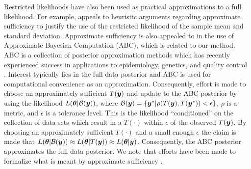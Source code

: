 \documentclass[12pt]{article}
\def\bth{\mbox{\boldmath $\theta$}}
\newcommand{\by}{\mbox{\boldmath $y$}}
\newcommand{\bz}{\mbox{\boldmath $z$}}
\newcommand{\red}[1]{{\color{red}#1}}
\begin{document}
Restricted likelihoods have also been used as practical approximations to a full likelihood. For example, \cite{pratt1965} appeals to heuristic arguments regarding approximate sufficiency to justify the use of the restricted likelihood of the sample mean and standard deviation. Approximate sufficiency is also appealed to in the use of Approximate Bayesian Computation (ABC), which is related to our method.  
ABC is a collection of posterior approximation methods which has recently experienced success in applications to epidemiology, genetics, and quality control \citep[see, for example,][]{tavare1997, pritchard1999,  marjoram2003, fearnhead2012}. Interest typically lies in the full data posterior and ABC is used for computational convenience as an approximation.  Consequently, effort is made to choose an approximately sufficient $T(\by)$ and update to the ABC posterior by using the likelihood $L(\bth| \mathcal{B}(\by))$, where $\mathcal{B}(\by)=\{\by^{*}|\rho(T(\by),T(\by^{*}))<\epsilon\}$, $\rho$ is a metric, and $\epsilon$ is a tolerance level. This is the likelihood ``conditioned'' on the collection of data sets which result in a $T(\cdot)$ within $\epsilon$ of the observed $T(\by)$. %
By choosing an approximately sufficient $T(\cdot)$ and a small enough $\epsilon$ the claim is made that $L(\bth|\mathcal{B}(\by))\approx L(\bth|T(\by))\approx L(\bth|\by)$. Consequently, the ABC posterior approximates the full data posterior. We note that efforts have been made to formalize what is meant by  approximate sufficiency \citep[e.g.,][]{joyce2008}.
 
\end{document}
